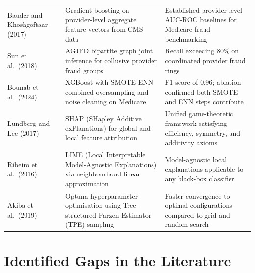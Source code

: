 \begin{longtable}{>{\raggedright\arraybackslash}p{3.8cm} >{\raggedright\arraybackslash}p{5.6cm} >{\raggedright\arraybackslash}p{4.8cm}}
Bauder and Khoshgoftaar (2017) \cite{bauder2017}
& Gradient boosting on provider-level aggregate feature vectors from CMS data
& Established provider-level AUC-ROC baselines for Medicare fraud benchmarking \\
\addlinespace

Sun et al.\ (2018) \cite{sun2018}
& AGJFD bipartite graph joint inference for collusive provider fraud groups
& Recall exceeding 80\% on coordinated provider fraud rings \\
\addlinespace

Bounab et al.\ (2024) \cite{bounab2024}
& XGBoost with SMOTE-ENN combined oversampling and noise cleaning on Medicare
& F1-score of 0.96; ablation confirmed both SMOTE and ENN steps contribute \\
\addlinespace

Lundberg and Lee (2017) \cite{lundberg2017}
& SHAP (SHapley Additive exPlanations) for global and local feature attribution
& Unified game-theoretic framework satisfying efficiency, symmetry, and additivity axioms \\
\addlinespace

Ribeiro et al.\ (2016) \cite{ribeiro2016}
& LIME (Local Interpretable Model-Agnostic Explanations) via neighbourhood linear approximation
& Model-agnostic local explanations applicable to any black-box classifier \\
\addlinespace

Akiba et al.\ (2019) \cite{akiba2019}
& Optuna hyperparameter optimisation using Tree-structured Parzen Estimator (TPE) sampling
& Faster convergence to optimal configurations compared to grid and random search \\

\end{longtable}

\section{Identified Gaps in the Literature}

